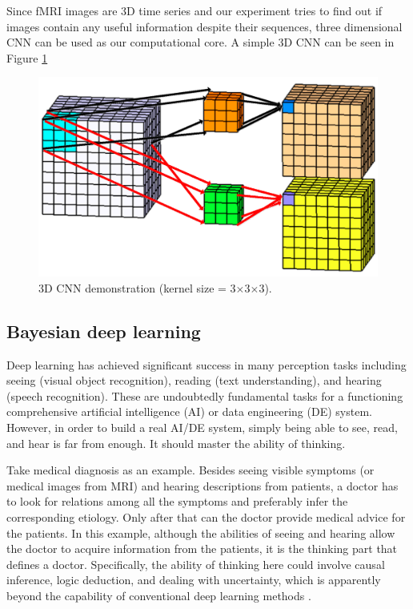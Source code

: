 \documentclass[a4paper,fleqn]{cas-dc}
\begin{document}
Since fMRI images are 3D time series and our experiment tries to find out if images contain any useful information despite their sequences, three dimensional CNN can be used as our computational core. A simple 3D CNN can be seen in Figure \ref{fig:CnnSample}

\begin{figure}
	\begin{center}
	\includegraphics[width=0.8\linewidth]{images/3dCnn}
	\end{center}
	\caption{3D CNN demonstration (kernel size = 3$\times$3$\times$3).}
	\label{fig:CnnSample}
\end{figure}




\subsection{Bayesian deep learning}
\label{section:bayesianDL}
Deep learning has achieved significant success in many perception tasks including seeing (visual object recognition), reading (text understanding), and hearing (speech recognition). These are undoubtedly fundamental tasks for a functioning comprehensive artificial intelligence (AI) or data engineering (DE) system. However, in order to build a real AI/DE system, simply being able to see, read, and hear is far from enough. It should master
the ability of thinking.

Take medical diagnosis as an example. Besides seeing
visible symptoms (or medical images from MRI) and hearing descriptions from patients, a doctor has to look for relations among all the symptoms and preferably infer the corresponding etiology. Only after that can the doctor provide medical advice for the patients. In this example, although the abilities of seeing and hearing allow the doctor to acquire information from the patients, it is the thinking part that defines a doctor. Specifically, the ability of thinking here could involve causal inference, logic deduction, and dealing with uncertainty, which is apparently beyond the capability of conventional deep learning methods \cite{Wang2016}.
\end{document}
